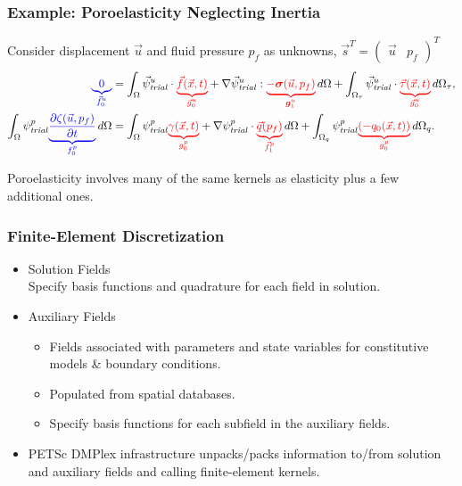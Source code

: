 \documentclass[aspectratio=169,hyperref=colorlinks]{beamer}
\begin{document}
\begin{frame}
  \frametitle{Example: Poroelasticity Neglecting Inertia}
  \summary{}

      Consider displacement $\vec{u}$ and fluid pressure $p_f$ as
      unknowns, $\vec{s}^T = \left( \begin{array}{cc} \vec{u} & p_f \end{array} \right)^T$
      \begin{align}
        \annotateL{0}{\vec{f}_0^u} &= \int_\Omega \trialvec[u] \cdot \annotateR{\vec{f}(\vec{x},t)}{\vec{g}^u_0} + \nabla \trialvec[u] : \annotateR{-\tensor{\sigma}(\vec{u},p_f)}{\tensor{g}^u_1} \, d\Omega + \int_{\Omega_\tau} \trialvec[u] \cdot \annotateR{\vec{\tau}(\vec{x},t)}{\vec{g}^u_0} \, d\Omega_\tau, \\
%
 \int_\Omega  \trialscalar[p] \annotateL{\frac{\partial \zeta(\vec{u},p_f)}{\partial t}}{f^p_0} \, d\Omega &= 
 \int_\Omega \trialscalar[p] \annotateR{\gamma(\vec{x},t)}{g^p_0} + \nabla \trialscalar[p] \cdot \annotateR{\vec{q}(p_f)}{\vec{f}^p_1} \, d\Omega
 + \int_{\Omega_q} \trialscalar[p] \annotateR{(-q_0(\vec{x},t))}{g^p_0} \, d\Omega_q.
      \end{align}

      Poroelasticity involves many of the same kernels as elasticity plus a few additional ones.

\end{frame}

\begin{frame}
  \frametitle{Finite-Element Discretization}

  \begin{itemize}
  \item Solution Fields \\
    Specify basis functions and quadrature for each field in solution.
  \item Auxiliary Fields 
    \begin{itemize}
    \item Fields associated with parameters and state variables for constitutive models \& boundary conditions.
    \item Populated from spatial databases.
    \item Specify basis functions for each subfield in the auxiliary fields.
    \end{itemize}
  \item PETSc DMPlex infrastructure unpacks/packs
    information to/from solution and auxiliary fields and calling
    finite-element kernels.
  \end{itemize}


\end{frame}
\end{document}
